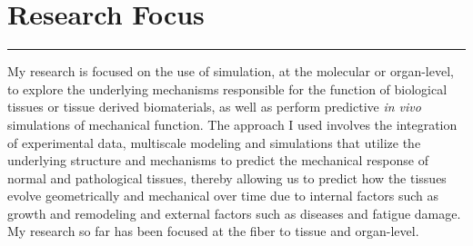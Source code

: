 \documentclass[11pt]{article}
\begin{document}

\section{Research Focus}
\hrule
\normalsize

\vspace{1eM}

	My research is focused on the use of simulation, at the molecular or organ-level, to explore the underlying mechanisms responsible for the function of biological tissues or tissue derived biomaterials, as well as perform predictive \textit{in vivo} simulations of mechanical function. The approach I used involves the integration of experimental data, multiscale modeling and simulations that utilize the underlying structure and mechanisms to predict the mechanical response of normal and pathological tissues, thereby allowing us to predict how the tissues evolve geometrically and mechanical over time due to internal factors such as growth and remodeling and external factors such as diseases and fatigue damage. My research so far has been focused at the fiber to tissue and organ-level. 
	
\end{document}

